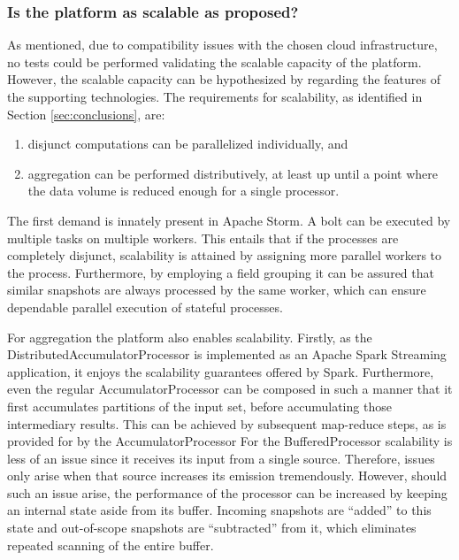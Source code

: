 \subsubsection{Is the platform as scalable as proposed?}
As mentioned, due to compatibility issues with the chosen cloud infrastructure, no tests could be performed validating the scalable capacity of the platform. However, the scalable capacity can be hypothesized by regarding the features of the supporting technologies. The requirements for scalability, as identified in Section \ref{sec:conclusions}, are:
\begin{enumerate}
\nospace
\item disjunct computations can be parallelized individually, and
\item aggregation can be performed distributively, at least up until a point where the data volume is reduced enough for a single processor.
\end{enumerate}
The first demand is innately present in Apache Storm. A bolt can be executed by multiple tasks on multiple workers. This entails that if the processes are completely disjunct, scalability is attained by assigning more parallel workers to the process. Furthermore, by employing a field grouping it can be assured that similar snapshots are always processed by the same worker, which can ensure dependable parallel execution of stateful processes.

For aggregation the platform also enables scalability. Firstly, as the DistributedAccumulatorProcessor is implemented as an Apache Spark Streaming application, it enjoys the scalability guarantees offered by Spark. Furthermore, even the regular AccumulatorProcessor can be composed in such a manner that it first accumulates partitions of the input set, before accumulating those intermediary results. This can be achieved by subsequent map-reduce steps, as is provided for by the AccumulatorProcessor For the BufferedProcessor scalability is less of an issue since it receives its input from a single source. Therefore, issues only arise when that source increases its emission tremendously. However, should such an issue arise, the performance of the processor can be increased by keeping an internal state aside from its buffer. Incoming snapshots are ``added'' to this state and out-of-scope snapshots are ``subtracted'' from it, which eliminates repeated scanning of the entire buffer.

